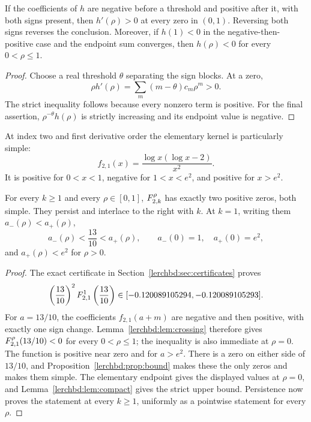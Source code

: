 \begin{lemma}\label{lerchbd:lem:crossing}
If the coefficients of $h$ are negative before a threshold and positive after it, with both signs present, then $h'(\rho)>0$ at every zero in $(0,1)$. Reversing both signs reverses the conclusion. Moreover, if $h(1)<0$ in the negative-then-positive case and the endpoint sum converges, then $h(\rho)<0$ for every $0<\rho\le1$.
\end{lemma}
\begin{proof}
Choose a real threshold $\theta$ separating the sign blocks. At a zero,
\[
 \rho h'(\rho)=\sum_m(m-\theta)c_m\rho^m>0.
\]
The strict inequality follows because every nonzero term is positive. For the final assertion, $\rho^{-\theta}h(\rho)$ is strictly increasing and its endpoint value is negative.
\end{proof}

At index two and first derivative order the elementary kernel is particularly simple:
\begin{equation}\label{lerchbd:eq:f21}
 f_{2,1}(x)=\frac{\log x(\log x-2)}{x^2}.
\end{equation}
It is positive for $0<x<1$, negative for $1<x<e^2$, and positive for $x>e^2$.

\begin{theorem}\label{lerchbd:thm:n2count}
For every $k\ge1$ and every $\rho\in[0,1]$, $F_{2,k}^{\rho}$ has exactly two positive zeros, both simple. They persist and interlace to the right with $k$. At $k=1$, writing them $a_-(\rho)<a_+(\rho)$,
\begin{equation}\label{lerchbd:eq:n2bracket}
 a_-(\rho)<\frac{13}{10}<a_+(\rho),\qquad
 a_-(0)=1,\quad a_+(0)=e^2,
\end{equation}
and $a_+(\rho)<e^2$ for $\rho>0$.
\end{theorem}
\begin{proof}
The exact certificate in Section~\ref{lerchbd:sec:certificates} proves
\begin{equation}\label{lerchbd:eq:n2test}
 \left(\frac{13}{10}\right)^2F_{2,1}^{1}\left(\frac{13}{10}\right)
 \in[-0.120089105294,-0.120089105293].
\end{equation}
For $a=13/10$, the coefficients $f_{2,1}(a+m)$ are negative and then positive, with exactly one sign change. Lemma~\ref{lerchbd:lem:crossing} therefore gives $F_{2,1}^{\rho}(13/10)<0$ for every $0<\rho\le1$; the inequality is also immediate at $\rho=0$. The function is positive near zero and for $a>e^2$. There is a zero on either side of $13/10$, and Proposition~\ref{lerchbd:prop:bound} makes these the only zeros and makes them simple. The elementary endpoint gives the displayed values at $\rho=0$, and Lemma~\ref{lerchbd:lem:compact} gives the strict upper bound. Persistence now proves the statement at every $k\ge1$, uniformly as a pointwise statement for every $\rho$.
\end{proof}

